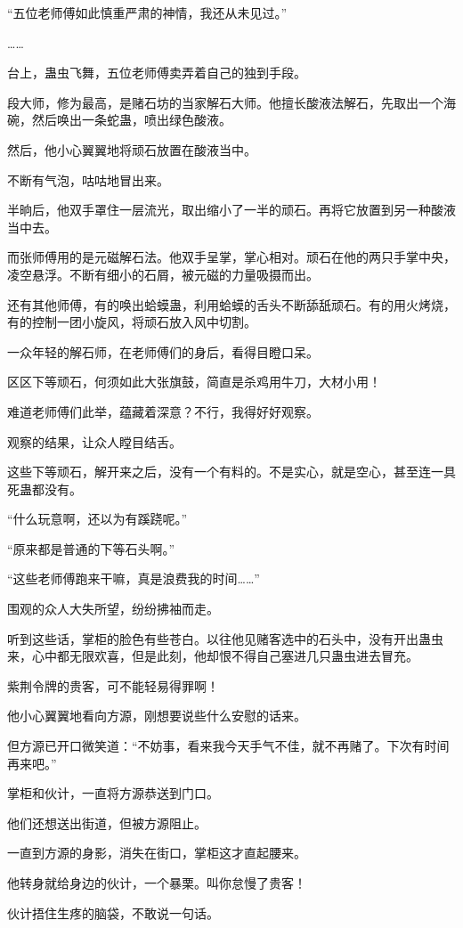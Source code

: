 \begin{this_body}
“五位老师傅如此慎重严肃的神情，我还从未见过。”

……

台上，蛊虫飞舞，五位老师傅卖弄着自己的独到手段。

段大师，修为最高，是赌石坊的当家解石大师。他擅长酸液法解石，先取出一个海碗，然后唤出一条蛇蛊，喷出绿色酸液。

然后，他小心翼翼地将顽石放置在酸液当中。

不断有气泡，咕咕地冒出来。

半晌后，他双手罩住一层流光，取出缩小了一半的顽石。再将它放置到另一种酸液当中去。

而张师傅用的是元磁解石法。他双手呈掌，掌心相对。顽石在他的两只手掌中央，凌空悬浮。不断有细小的石屑，被元磁的力量吸摄而出。

还有其他师傅，有的唤出蛤蟆蛊，利用蛤蟆的舌头不断舔舐顽石。有的用火烤烧，有的控制一团小旋风，将顽石放入风中切割。

一众年轻的解石师，在老师傅们的身后，看得目瞪口呆。

区区下等顽石，何须如此大张旗鼓，简直是杀鸡用牛刀，大材小用！

难道老师傅们此举，蕴藏着深意？不行，我得好好观察。

观察的结果，让众人瞠目结舌。

这些下等顽石，解开来之后，没有一个有料的。不是实心，就是空心，甚至连一具死蛊都没有。

“什么玩意啊，还以为有蹊跷呢。”

“原来都是普通的下等石头啊。”

“这些老师傅跑来干嘛，真是浪费我的时间……”

围观的众人大失所望，纷纷拂袖而走。

听到这些话，掌柜的脸色有些苍白。以往他见赌客选中的石头中，没有开出蛊虫来，心中都无限欢喜，但是此刻，他却恨不得自己塞进几只蛊虫进去冒充。

紫荆令牌的贵客，可不能轻易得罪啊！

他小心翼翼地看向方源，刚想要说些什么安慰的话来。

但方源已开口微笑道：“不妨事，看来我今天手气不佳，就不再赌了。下次有时间再来吧。”

掌柜和伙计，一直将方源恭送到门口。

他们还想送出街道，但被方源阻止。

一直到方源的身影，消失在街口，掌柜这才直起腰来。

他转身就给身边的伙计，一个暴栗。叫你怠慢了贵客！

伙计捂住生疼的脑袋，不敢说一句话。


\end{this_body}
